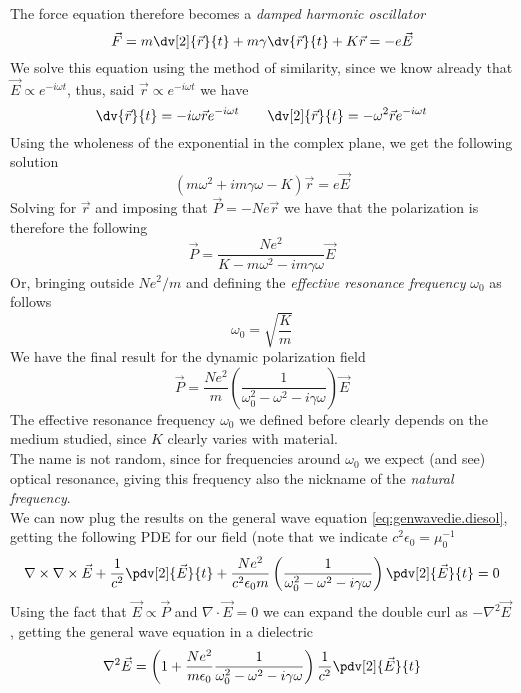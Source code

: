 \documentclass[../electromagnetism.tex]{subfiles}
\begin{document}
The force equation therefore becomes a \textit{damped harmonic oscillator}
\begin{equation}
	\vec{F}=m\dv[2]{\vec{r}}{t}+m\gamma\dv{\vec{r}}{t}+K\vec{r}=-e\vec{E}
	\label{eq:dho.diesol}
\end{equation}
We solve this equation using the method of similarity, since we know already that $\vec{E}\propto e^{-i\omega t}$, thus, said $\vec{r}\propto e^{-i\omega t}$ we have
\begin{equation*}
	\dv{\vec{r}}{t}=-i\omega\vec{r}e^{-i\omega t}\qquad\dv[2]{\vec{r}}{t}=-\omega^2\vec{r}e^{-i\omega t}
\end{equation*}
Using the wholeness of the exponential in the complex plane, we get the following solution
\begin{equation}
	\left( m\omega^2+im\gamma\omega-K \right)\vec{r}=e\vec{E}
	\label{eq:soldho.diesol}
\end{equation}
Solving for $\vec{r}$ and imposing that $\vec{P}=-Ne\vec{r}$ we have that the polarization is therefore the following
\begin{equation*}
	\vec{P}=\frac{Ne^2}{K-m\omega^2-im\gamma\omega}\vec{E}
\end{equation*}
Or, bringing outside $Ne^2/m$ and defining the \textit{effective resonance frequency} $\omega_0$ as follows
\begin{equation}
	\omega_0=\sqrt{\frac{K}{m}}
	\label{eq:effresfreq.diesol}
\end{equation}
We have the final result for the dynamic polarization field
\begin{equation}
	\vec{P}=\frac{Ne^2}{m}\left( \frac{1}{\omega_0^2-\omega^2-i\gamma\omega} \right)\vec{E}
	\label{eq:macrop.diesol}
\end{equation}
The effective resonance frequency $\omega_0$ we defined before clearly depends on the medium studied, since $K$ clearly varies with material.\\
The name is not random, since for frequencies around $\omega_0$ we expect (and see) optical resonance, giving this frequency also the nickname of the \textit{natural frequency}.\\
We can now plug the results on the general wave equation \eqref{eq:genwavedie.diesol}, getting the following PDE for our field (note that we indicate $c^2\epsilon_0=\mu_0^{-1}$
\begin{equation}
	\nabla\times\nabla\times\vec{E}+\frac{1}{c^2}\pdv[2]{\vec{E}}{t}+\frac{Ne^2}{c^2\epsilon_0 m}\left( \frac{1}{\omega_0^2-\omega^2-i\gamma\omega} \right)\pdv[2]{\vec{E}}{t}=0
	\label{eq:diegenweq2.diesol}
\end{equation}
Using the fact that $\vec{E}\propto\vec{P}$ and $\nabla\cdot\vec{E}=0$ we can expand the double curl as $-\nabla^2\vec{E}$, getting the general wave equation in a dielectric
\begin{equation}
	\nabla^2\vec{E}=\left( 1+\frac{Ne^2}{m\epsilon_0}\frac{1}{\omega_0^2-\omega^2-i\gamma\omega} \right)\frac{1}{c^2}\pdv[2]{\vec{E}}{t}
	\label{eq:geneq.diesol}
\end{equation}
\end{document}
